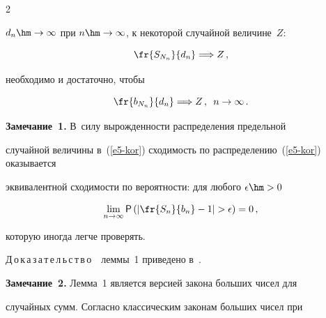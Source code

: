 \begin{multicols}{2}
{$d_n\hm\to\infty$ при $n\hm\to\infty$, к некоторой случайной величине~$Z$:


\begin{equation}


\fr{S_{N_n}}{d_n}\Longrightarrow Z\,,\label{e6-kor}


\end{equation}


необходимо и достаточно, чтобы}


\begin{equation}


\fr{b_{N_n}}{d_n}\Longrightarrow Z\,,\enskip n\to\infty\,.\label{e7-kor}


\end{equation}








\smallskip





\noindent


\textbf{Замечание~1.} В~силу вырожденности распределения предельной


случайной величины в~(\ref{e5-kor}) сходимость по распределению~(\ref{e5-kor}) оказывается


эквивалентной сходимости по вероятности: для любого $\epsilon\hm>0$


$$


\lim\limits_{n\to\infty}{\sf P}\left(\left\vert \fr{S_n}{b_n}-1\right\vert >\epsilon\right)=0\,,


$$


которую иногда легче проверять.





\smallskip





\noindent


Д\,о\,к\,а\,з\,а\,т\,е\,л\,ь\,с\,т\,в\,о\ \ леммы~1 приведено в~\cite{Korolev1994}.





\smallskip





\noindent


\textbf{Замечание~2.} Лемма~1 является версией закона больших чисел для


случайных сумм. Согласно классическим законам больших чисел при



\end{multicols}
